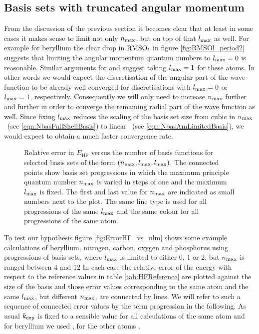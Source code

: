 \subsection{Basis sets with truncated angular momentum}
From the discussion of the previous section
it becomes clear that at least in some cases it makes sense to
limit not only $n_\text{max}$, but on top of that $l_\text{max}$ as well.
For example for beryllium the clear drop in $\text{RMSO}_l$
in figure \ref{fig:RMSOl_period2} suggests that limiting the angular
momentum quantum numbers to $l_\text{max} = 0$ is reasonable.
Similar arguments for  and  suggest taking $l_\text{max} = 1$ for these atoms.
In other words we would expect the discretisation
of the angular part of the wave function to be already well-converged
for \CS discretisations with $l_\text{max} = 0$ or $l_\text{max} = 1$, respectively.
Consequently we will only need to increase $n_\text{max}$ further and further
in order to converge the remaining radial part of the wave function as well.
Since fixing $l_\text{max}$ reduces the scaling of the basis set size
from cubic in $n_\text{max}$~(see \eqref{eqn:NbasFullShellBasis}) to linear%
~(see \eqref{eqn:NbasAmLimitedBasis}),
we would expect to obtain a much faster convergence rate.

\begin{figure}
	\centering
	\caption[
		Relative error in $E_\text{HF}$ versus the number of basis functions
		for some \CS discretisations.
	]{
		Relative error in $E_\text{HF}$ versus the number of basis functions
		for selected \CS basis sets of the form $(n_\text{max}, l_\text{max}, l_\text{max})$.
		The connected points show basis set progressions
		in which the maximum principle quantum number 
		$n_\text{max}$ is varied in steps of one and the maximum $l_\text{max}$ is fixed.
		The first and last value for $n_\text{max}$ are indicated as small numbers
		next to the plot.
		The same line type is used for all progressions of the same $l_\text{max}$
		and the same colour for all progressions of the same atom.
	}
	\label{fig:ErrorHF_vs_nlm}
\end{figure}
To test our hypothesis figure \vref{fig:ErrorHF_vs_nlm} shows some
example calculations
of beryllium, nitrogen, carbon, oxygen and phosphorus
using progressions of \CS basis sets, where $l_\text{max}$ is limited
to either $0$, $1$ or $2$,
but $n_\text{max}$ is ranged between $4$ and $12$
In each case the relative error of the \HF energy
with respect to the reference values in table \ref{tab:HFReference}
are plotted against the size of the \CS basis
and those error values corresponding to the same atom and the same $l_\text{max}$,
but different $n_\text{max}$, are connected by lines.
We will refer to such a sequence of connected error values
by the term progression in the following.
As usual $k_\text{exp}$ is fixed to a sensible value for all calculations
of the same atom
and for beryllium we used \RHF, for the other atoms \UHF.

